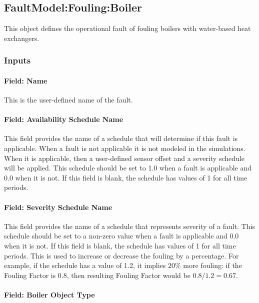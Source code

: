 \subsection{FaultModel:Fouling:Boiler}\label{faultmodelfoulingboiler}

This object defines the operational fault of fouling boilers with water-based heat exchangers.

\subsubsection{Inputs}

\paragraph{Field: Name}

This is the user-defined name of the fault.

\paragraph{Field: Availability Schedule Name}

This field provides the name of a schedule that will determine if this fault is applicable. When a fault is not applicable it is not modeled in the simulations. When it is applicable, then a user-defined sensor offset and a severity schedule will be applied. This schedule should be set to 1.0 when a fault is applicable and 0.0 when it is not. If this field is blank, the schedule has values of 1 for all time periods.

\paragraph{Field: Severity Schedule Name}

This field provides the name of a schedule that represents severity of a fault. This schedule should be set to a non-zero value when a fault is applicable and 0.0 when it is not. If this field is blank, the schedule has values of 1 for all time periods.
This is used to increase or decrease the fouling by a percentage. For example, if the schedule has a value of 1.2, it implies 20\% more fouling: if the Fouling Factor is 0.8, then resulting Fouling Factor would be $0.8 / 1.2 = 0.67$.

\paragraph{Field: Boiler Object Type}\label{field-boiler-object-type}

